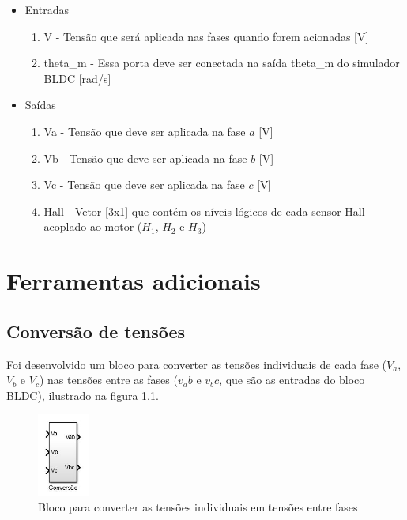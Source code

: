         \begin{itemize}
            \item Entradas
            \begin{enumerate}
                \item V - Tensão que será aplicada nas fases quando forem acionadas [V]
                \item theta\_m - Essa porta deve ser conectada na saída theta\_m do simulador BLDC [rad/s]
            \end{enumerate}
            \item Saídas
            \begin{enumerate}
                \item Va - Tensão que deve ser aplicada na fase $a$ [V]
                \item Vb - Tensão que deve ser aplicada na fase $b$ [V]
                \item Vc - Tensão que deve ser aplicada na fase $c$ [V]
                \item Hall - Vetor [3x1] que contém os níveis lógicos de cada sensor Hall acoplado ao motor ($H_1$, $H_2$ e $H_3$)
            \end{enumerate}
        \end{itemize}

\chapter{Ferramentas adicionais}

    \section{Conversão de tensões}
        Foi desenvolvido um bloco para converter as tensões individuais de cada fase ($V_a$, $V_b$ e $V_c$) nas tensões entre as fases ($v_ab$ e $v_bc$, que são as entradas do bloco BLDC), ilustrado na figura \ref{fig:bloco_conversao_tensoes}.
        \begin{figure}[ht]
            \centering
            \includegraphics[width = 0.15\textwidth]{bloco_conversao_tensoes}
            \caption{Bloco para converter as tensões individuais em tensões entre fases}
            \label{fig:bloco_conversao_tensoes}
        \end{figure}

